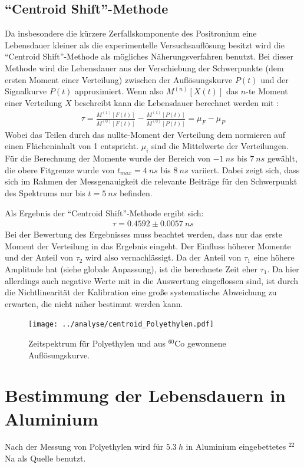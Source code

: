 \documentclass[a4paper,12pt]{article}
\begin{document}
\subsection{"`Centroid Shift"'-Methode}
Da insbesondere die kürzere Zerfallskomponente des Positronium eine Lebensdauer kleiner als die
experimentelle Versuchsauflösung besitzt wird die "`Centroid Shift"'-Methode \cite{versuchsanleitung}
als mögliches Näherungsverfahren benutzt. Bei dieser Methode wird die Lebensdauer aus der Verschiebung der Schwerpunkte (dem ersten Moment einer Verteilung)
zwischen der Auflösungskurve $P(t)$ und der Signalkurve $P(t)$ approximiert.
Wenn also $M^{(n)}[X(t)]$ das $n$-te Moment einer Verteilung $X$ beschreibt kann die Lebensdauer
berechnet werden mit \cite{versuchsanleitung}:
\begin{align*}
	\tau = \frac{M^{(1)}[F(t)]}{M^{(0)}[F(t)]} - \frac{M^{(1)}[P(t)]}{M^{(0)}[P(t)]  } = μ_{F} -
	μ_{P}
\end{align*}
Wobei das Teilen durch das nullte-Moment der Verteilung dem normieren auf einen Flächeninhalt von 1 entspricht.
$μ_i$ sind die Mittelwerte der Verteilungen.
Für die Berechnung der Momente wurde der Bereich von $\SI{-1}{ns}$ bis $\SI{7}{ns}$ gewählt, die obere Fitgrenze wurde von $t_{max}=\SI{4}{ns}$ bis $\SI{8}{ns}$ variiert. Dabei zeigt sich, dass
sich im Rahmen der Messgenauigkeit die relevante Beiträge für den Schwerpunkt des Spektrums nur bis  $t=\SI{5}{ns}$ befinden.

Als Ergebnis der "`Centroid Shift"'-Methode ergibt sich:
\begin{align*}
	τ = 0.4592 \pm \SI{0.0057}{ns}
\end{align*}
Bei der Bewertung des Ergebnisses muss beachtet werden, dass nur das
erste Moment der Verteilung in das Ergebnis eingeht. Der Einfluss höherer Momente und der Anteil von
$τ_2$ wird also vernachlässigt. Da der Anteil von $τ_1$ eine höhere Amplitude hat (siehe globale
Anpassung), ist die berechnete Zeit eher $τ_1$.
Da hier allerdings auch negative Werte mit in die Auswertung eingeflossen sind, ist durch die
Nichtlinearität der Kalibration eine große systematische Abweichung zu erwarten, die nicht näher
bestimmt werden kann.
\begin{figure}
	\texttt{[image: ../analyse/centroid\_Polyethylen.pdf]}
	\caption{Zeitspektrum für Polyethylen und aus $^{60}$Co gewonnene Auflösungskurve. }
	\label{fig:compare_signal}
\end{figure}

\section{Bestimmung der Lebensdauern in Aluminium}
Nach der Messung von Polyethylen wird für $\SI{5.3}{h}$ in Aluminium eingebettetes $^{22}$Na als Quelle benutzt.
\end{document}
